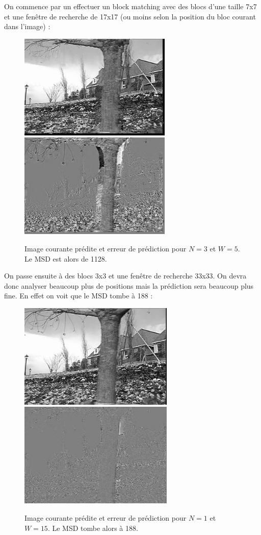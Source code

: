 \documentclass[a4paper, 12pt]{article}
\begin{document}
On commence par un effectuer un block matching avec des blocs d'une taille 7x7 et une fenêtre de recherche de 17x17 (ou moins selon la position du bloc courant dans l'image) :

\begin{figure}[H]
	\centering
	\includegraphics[height=5cm]{../Resultats/Garden/garden_pred_n_3_w_5.jpg}
	\includegraphics[height=5cm]{../Resultats/Garden/garden_error_n_3_w_5.jpg}
	\caption{Image courante prédite et erreur de prédiction pour $N=3$ et $W=5$. Le MSD est alors de 1128.}
	\label{fig:garden_3_5}
\end{figure}

On passe ensuite à des blocs 3x3 et une fenêtre de recherche 33x33. On devra donc analyser beaucoup plus de positions mais la prédiction sera beaucoup plus fine. En effet on voit que le MSD tombe à 188 :

\begin{figure}[H]
	\centering
	\includegraphics[height=5cm]{../Resultats/Garden/garden_pred_n_1_w_15.jpg}
	\includegraphics[height=5cm]{../Resultats/Garden/garden_error_n_1_w_15.jpg}
	\caption{Image courante prédite et erreur de prédiction pour $N=1$ et $W=15$. Le MSD tombe alors à 188.}
	\label{fig:garden_1_15}
\end{figure}
\end{document}
